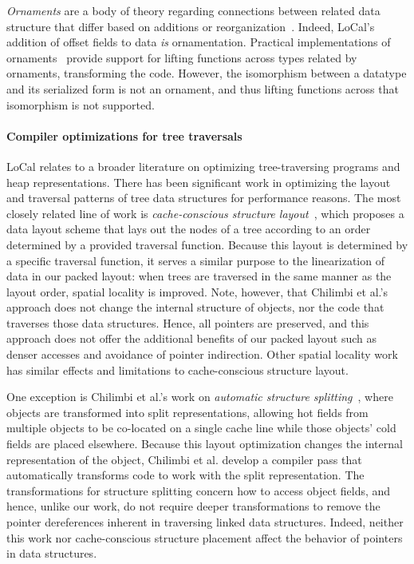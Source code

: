 \documentclass[showabstract,showacknowledgments,showpreface,showdedication,school]{iuphd}
\theoremstyle{nonumberplain}
\newcommand{\sysname}[0]{LoCal\xspace}
\newcommand{\ourcalc}[0]{\sysname}
\begin{document}
\emph{Ornaments} are a body of theory regarding connections between related
data structure that differ based on additions or
reorganization~\cite{ornaments}.
Indeed, \ourcalc's addition of offset fields to data \emph{is} ornamentation.
Practical implementations of ornaments~\cite{ornament-ml} provide support for
lifting functions across types related by ornaments, transforming the code.
However, the isomorphism between a datatype and its serialized form is not an
ornament, and thus lifting functions across that isomorphism is not supported.


\paragraph{Compiler optimizations for tree traversals}

\ourcalc{} relates to a broader literature on optimizing
tree-traversing programs and heap representations.
There has been significant work in optimizing the layout and
traversal patterns of tree data structures for performance reasons.
The most closely related line of work is \emph{cache-conscious structure
  layout}~\cite{chilimbi1999}, which proposes a data layout scheme that lays out
the nodes of a tree according to an order determined by a provided traversal
function. Because this layout is determined by a specific traversal function,
it serves a similar purpose to the linearization of data in our packed layout:
when trees are traversed in the same manner as the layout order, spatial
locality is improved. Note, however, that Chilimbi et al.'s approach does not
change the internal structure of objects, nor the code that traverses those
data structures. Hence, all pointers are preserved, and this approach does not
offer the additional benefits of our packed layout such as denser accesses and
avoidance of pointer indirection. Other spatial locality
work~\cite{Truong1998,Lattner2005,Chilimbi1999a} has similar effects and
limitations to cache-conscious structure layout.

One exception is Chilimbi et al.'s work on \emph{automatic structure
splitting}~\cite{Chilimbi1999b}, where objects are transformed into split
representations, allowing hot fields from multiple objects to be co-located on
a single cache line while those objects' cold fields are placed elsewhere.
Because this layout optimization changes the internal representation of the
object, Chilimbi et al. develop a compiler pass that automatically transforms
code to work with the split representation. The transformations for structure
splitting concern how to access object fields, and hence, unlike our work, do
not require deeper transformations to remove the pointer dereferences inherent
in traversing linked data structures. Indeed, neither this work nor
cache-conscious structure placement affect the behavior of pointers in data
structures.
\end{document}
